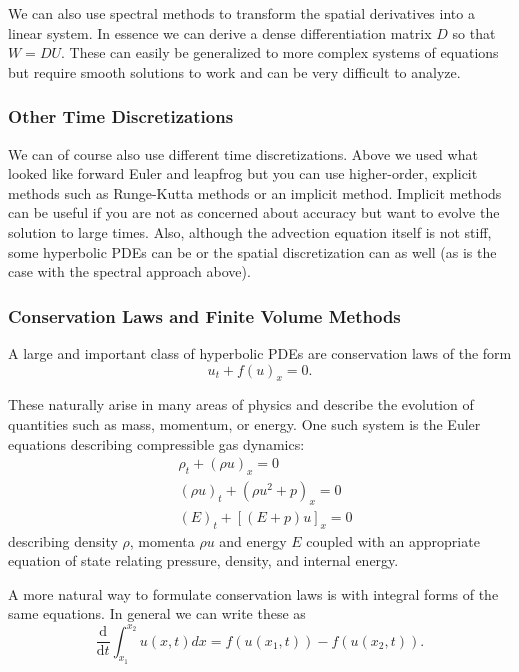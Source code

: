 \documentclass[11pt]{article}
\begin{document}
We can also use spectral methods to transform the spatial derivatives
into a linear system. In essence we can derive a dense differentiation
matrix \(D\) so that \(W = D U\). These can easily be generalized to
more complex systems of equations but require smooth solutions to work
and can be very difficult to analyze.

    \hypertarget{other-time-discretizations}{%
\subsubsection{Other Time
Discretizations}\label{other-time-discretizations}}

We can of course also use different time discretizations. Above we used
what looked like forward Euler and leapfrog but you can use
higher-order, explicit methods such as Runge-Kutta methods or an
implicit method. Implicit methods can be useful if you are not as
concerned about accuracy but want to evolve the solution to large times.
Also, although the advection equation itself is not stiff, some
hyperbolic PDEs can be or the spatial discretization can as well (as is
the case with the spectral approach above).

    \hypertarget{conservation-laws-and-finite-volume-methods}{%
\subsubsection{Conservation Laws and Finite Volume
Methods}\label{conservation-laws-and-finite-volume-methods}}

A large and important class of hyperbolic PDEs are conservation laws of
the form \[
    u_t + f(u)_x = 0.
\]

    These naturally arise in many areas of physics and describe the
evolution of quantities such as mass, momentum, or energy. One such
system is the Euler equations describing compressible gas dynamics:
\[\begin{aligned}
    &\rho_t + (\rho u)_x = 0 \\
    &(\rho u)_t + (\rho u^2 + p)_x = 0 \\
    &(E)_t + [(E + p) u]_x = 0
\end{aligned}\] describing density \(\rho\), momenta \(\rho u\) and
energy \(E\) coupled with an appropriate equation of state relating
pressure, density, and internal energy.

    A more natural way to formulate conservation laws is with integral forms
of the same equations. In general we can write these as \[
    \frac{\text{d}}{\text{d}t} \int^{x_2}_{x_1} u(x, t) dx = f(u(x_1,t)) - f(u(x_2, t)).
\]
\end{document}
